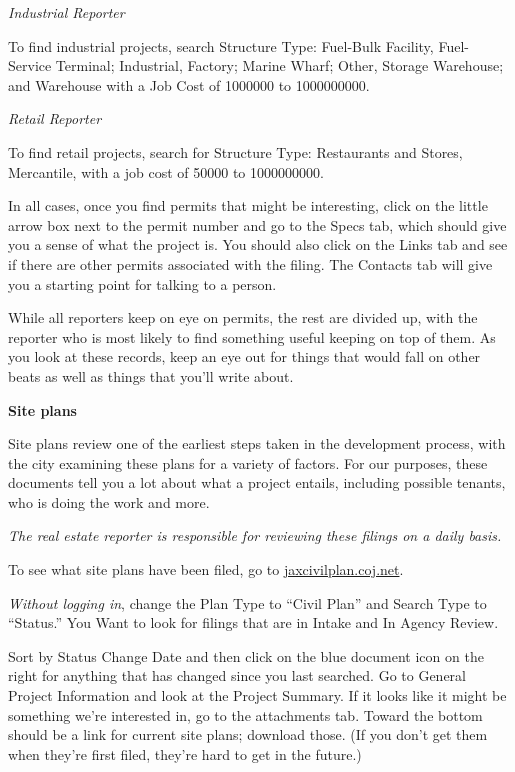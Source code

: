 \documentclass[
  11pt,
  american,
  letterpaperpaper,
  extrafontsizes,onecolumn,openright
  ]{memoir}
\newlength{\rf}
\begin{document}
\newpage

\emph{Industrial Reporter}

To find industrial projects, search Structure Type: Fuel-Bulk Facility, Fuel-Service Terminal; Industrial, Factory; Marine Wharf; Other, Storage Warehouse; and Warehouse with a Job Cost of 1000000 to 1000000000.

\emph{Retail Reporter}

To find retail projects, search for Structure Type: Restaurants and Stores, Mercantile, with a job cost of 50000 to 1000000000.

In all cases, once you find permits that might be interesting, click on the little arrow box next to the permit number and go to the Specs tab, which should give you a sense of what the project is. You should also click on the Links tab and see if there are other permits associated with the filing. The Contacts tab will give you a starting point for talking to a person.

While all reporters keep on eye on permits, the rest are divided up, with the reporter who is most likely to find something useful keeping on top of them. As you look at these records, keep an eye out for things that would fall on other beats as well as things that you'll write about.

\textbf{Site plans}

Site plans review one of the earliest steps taken in the development process, with the city examining these plans for a variety of factors. For our purposes, these documents tell you a lot about what a project entails, including possible tenants, who is doing the work and more.

\emph{The real estate reporter is responsible for reviewing these filings on a daily basis.}

To see what site plans have been filed, go to \href{https://jaxcivilplan.coj.net/}{jaxcivilplan.coj.net}.

\emph{Without logging in}, change the Plan Type to \enquote{Civil Plan} and Search Type to \enquote{Status.} You Want to look for filings that are in Intake and In Agency Review.

Sort by Status Change Date and then click on the blue document icon on the right for anything that has changed since you last searched. Go to General Project Information and look at the Project Summary. If it looks like it might be something we're interested in, go to the attachments tab. Toward the bottom should be a link for current site plans; download those. (If you don't get them when they're first filed, they're hard to get in the future.)
\end{document}
